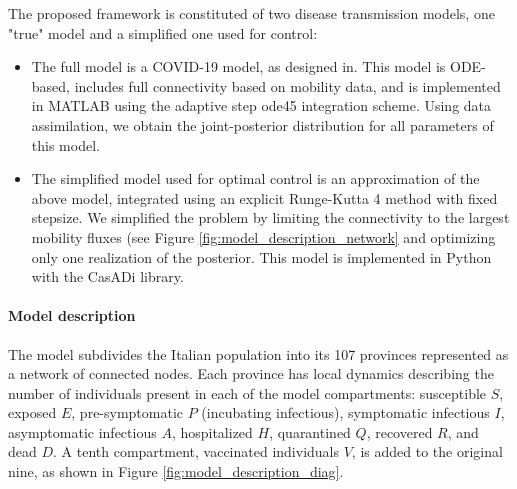 The proposed framework is constituted of two disease transmission models, one "true" model and a simplified one used for control:
\begin{itemize}
    \item The full model is a COVID-19 model, as designed in\cite{Gatto:SpreadDynamicsCOVID19:2020, Bertuzzo:GeographyCOVID19Spread:2020}. This model is ODE-based, includes full connectivity based on mobility data, and is implemented in MATLAB using the adaptive step ode45 integration scheme. Using data assimilation, we obtain the joint-posterior distribution for all parameters of this model. 
    \item The simplified model used for optimal control is an approximation of the above model, integrated using an explicit Runge-Kutta 4 method with fixed stepsize. We simplified the problem by limiting the connectivity to the largest mobility fluxes (see Figure \ref{fig:model_description_network} and optimizing only one realization of the posterior. This model is implemented in Python with the CasADi library.
\end{itemize}

\paragraph{Model description}
The model subdivides the Italian population into its 107 provinces represented as a network of connected nodes. Each province has local dynamics describing the number of individuals present in each of the model compartments: susceptible $S$, exposed $E$, pre-symptomatic $P$ (incubating infectious), symptomatic infectious $I$, asymptomatic infectious $A$, hospitalized $H$, quarantined $Q$, recovered $R$, and dead $D$. A tenth compartment, vaccinated individuals $V$, is added to the original nine, as shown in Figure \ref{fig:model_description_diag}.

